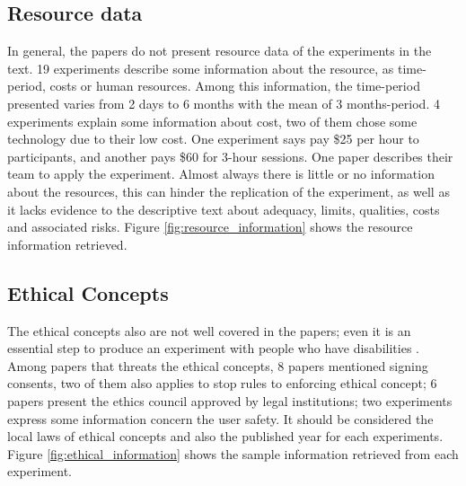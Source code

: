 \subsection{Resource data}
\label{subsec:results-resource-data}

In general, the papers do not present resource data of the experiments in the text. 19 experiments describe some information about the resource, as time-period, costs or human resources. Among this information, the time-period presented varies from 2 days to 6 months with the mean of 3 months-period. 4 experiments explain some information about cost, two of them chose some technology due to their low cost. One experiment says pay \$25 per hour to participants, and another pays \$60 for 3-hour sessions. One paper describes their team to apply the experiment. Almost always there is little or no information about the resources, this can hinder the replication of the experiment, as well as it lacks evidence to the descriptive text about adequacy, limits, qualities, costs and associated risks. Figure \ref{fig:resource_information} shows the resource information retrieved.


	\begin{figure}[h] 

   	    \captionsetup{width=12cm}%
	\end{figure}

\subsection{Ethical Concepts}
\label{subsec:results-ethical-concepts}


The ethical concepts also are not well covered in the papers; even it is an essential step to produce an experiment with people who have disabilities \cite{Wohlin2000}. Among papers that threats the ethical concepts, 8 papers mentioned signing consents, two of them also applies to stop rules to enforcing ethical concept; 6 papers present the ethics council approved by legal institutions; two experiments express some information concern the user safety. It should be considered the local laws of ethical concepts and also the published year for each experiments. Figure \ref{fig:ethical_information} shows the sample information retrieved from each experiment. 

